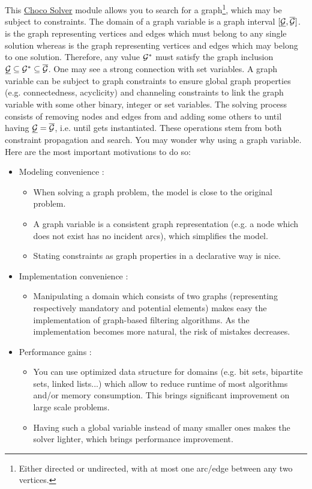\documentclass{article}
\begin{document}
This \href{http://www.choco-solver.org/}{Choco Solver} module allows you to search for a graph\footnote{Either directed or undirected, with at most one arc/edge between any two vertices. }, which may be subject to constraints. 
%
The domain of a graph variable \GV{} is a graph interval $[\underline{\mathcal{G}}{},\overline{\mathcal{G}}{}]$. \GLB{} is the graph representing vertices and edges which must belong to any single solution whereas \GUB{} is the graph representing vertices and edges which may belong to one solution. Therefore, any value $\mathcal{G}{}^*$ must satisfy the graph inclusion $\underline{\mathcal{G}}{} \subseteq \mathcal{G}{}^* \subseteq \overline{\mathcal{G}}{}$. One may see a strong connection with set variables.
%
A graph variable can be subject to graph constraints to ensure global graph properties (e.g. connectedness, acyclicity) and channeling constraints to link the graph variable with some other binary, integer or set variables. 
%
The solving process consists of removing nodes and edges from \GUB{} and adding some others to \GLB{} until having $\underline{\mathcal{G}}{} = \overline{\mathcal{G}}{}$, i.e. until \GV{} gets instantiated. These operations stem from both constraint propagation and search. You may wonder why using a graph variable. Here are the most important motivations to do so:
\begin{itemize}
\item Modeling convenience : 
\begin{itemize}
\item When solving a graph problem, the model is close to the original problem. 
\item A graph variable is a consistent graph representation (e.g. a node which does not exist has no incident arcs), which simplifies the model. 
\item Stating constraints as graph properties in a declarative way is nice. 
\end{itemize}
\item Implementation convenience : 
\begin{itemize}
\item Manipulating a domain which consists of two graphs (representing respectively mandatory and potential elements) makes easy the implementation of graph-based filtering algorithms. As the implementation becomes more natural, the risk of mistakes decreases.
\end{itemize}
\item Performance gains : 
\begin{itemize}
\item You can use optimized data structure for domains (e.g. bit sets, bipartite sets, linked lists...) which allow to reduce runtime of most algorithms and/or memory consumption. This brings significant improvement on large scale problems. 
\item Having such a global variable instead of many smaller ones makes the solver lighter, which brings performance improvement.
\end{itemize}
\end{itemize}
\end{document}
